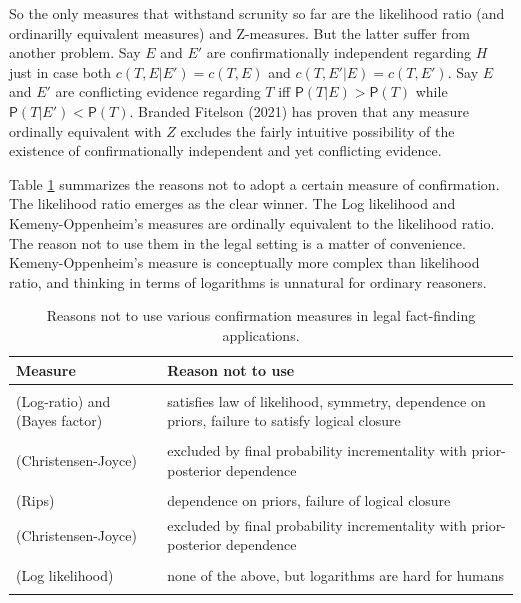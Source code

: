 \documentclass[
  10pt,
  dvipsnames,enabledeprecatedfontcommands]{scrartcl}
\newcommand{\pr}[1]{\mathsf{P}(#1)}
\begin{document}
So the only measures that withstand scrunity so far are the likelihood
ratio (and ordinarilly equivalent measures) and Z-measures. But the
latter suffer from another problem. Say \(E\) and \(E'\) are
confirmationally independent regarding \(H\) just in case both
\(c(T, E \vert E' ) = c(T, E )\) and \(c(T, E' \vert E ) = c(T, E')\).
Say \(E\) and \(E'\) are conflicting evidence regarding \(T\) iff
\(\pr{T\vert E}> \pr{T}\) while \(\pr{T\vert E'} < \pr{T}\). Branded
Fitelson (2021) has proven that any measure ordinally equivalent with
\(Z\) excludes the fairly intuitive possibility of the existence of
confirmationally independent and yet conflicting evidence.

Table \ref{tab:confirmation} summarizes the reasons not to adopt a
certain measure of confirmation. The likelihood ratio emerges as the
clear winner. The Log likelihood and Kemeny-Oppenheim's measures are
ordinally equivalent to the likelihood ratio. The reason not to use them
in the legal setting is a matter of convenience. Kemeny-Oppenheim's
measure is conceptually more complex than likelihood ratio, and thinking
in terms of logarithms is unnatural for ordinary reasoners.

\begin{table}
\centering\begingroup\fontsize{9}{11}\selectfont

\begin{tabular}{lp{10cm}}
\toprule
Measure & Reason not to use\\
\midrule
\cellcolor{gray!6}{(Difference)} & \cellcolor{gray!6}{dependence on priors, logical closure failure}\\
(Log-ratio) and (Bayes factor) & satisfies law of likelihood, symmetry, dependence on priors, failure to satisfy logical closure\\
\cellcolor{gray!6}{(Generalized entailment)} & \cellcolor{gray!6}{dependence on priors, independent conflicting evidence}\\
(Christensen-Joyce) & excluded by final probability incrementality with prior-posterior dependence\\
\cellcolor{gray!6}{(Carnap)} & \cellcolor{gray!6}{excluded by final probability incrementality with prior-posterior dependence, symmetry, logical closure failure}\\
(Rips) & dependence on priors, failure of logical closure\\
(Christensen-Joyce) & excluded by final probability incrementality with prior-posterior dependence\\
\cellcolor{gray!6}{(Kemeny-Oppenheim)} & \cellcolor{gray!6}{none of the above, but unnecessarily complex}\\
(Log likelihood) & none of the above, but logarithms are hard for humans\\
\cellcolor{gray!6}{(Likelihood ratio)} & \cellcolor{gray!6}{none of the above}\\
\bottomrule
\end{tabular}
\endgroup{}
\caption{Reasons not to use various confirmation measures in legal fact-finding applications.}
\label{tab:confirmation}
\end{table}
\end{document}
